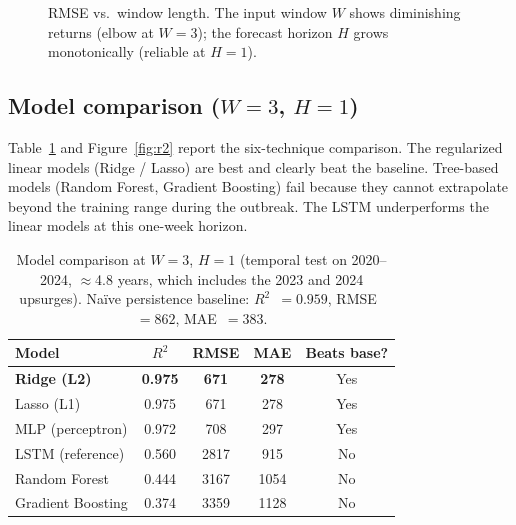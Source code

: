 \documentclass[runningheads]{llncs}
\newcommand{\Rsq}{$R^2$}
\begin{document}
\begin{figure}[H]
\centering
{}
\caption{RMSE vs.\ window length. The input window $W$ shows diminishing returns
(elbow at $W=3$); the forecast horizon $H$ grows monotonically (reliable at $H=1$).}
\label{fig:windows}
\end{figure}

\subsection{Model comparison ($W=3$, $H=1$)}
Table~\ref{tab:models} and Figure~\ref{fig:r2} report the six-technique comparison. The
regularized linear models (Ridge / Lasso) are best and clearly beat the baseline. Tree-based
models (Random Forest, Gradient Boosting) fail because they cannot extrapolate beyond the
training range during the outbreak. The LSTM underperforms the linear models at this
one-week horizon.

\begin{table}[t]
\centering\footnotesize
\caption{Model comparison at $W=3$, $H=1$ (temporal test on 2020--2024, $\approx$4.8 years,
which includes the 2023 and 2024 upsurges).
Na\"ive persistence baseline: \Rsq{}~$=0.959$, RMSE~$=862$, MAE~$=383$.}
\label{tab:models}
\begin{tabular}{@{}lcccc@{}}
\toprule
Model & \Rsq{} & RMSE & MAE & Beats base? \\
\midrule
\textbf{Ridge (L2)} & \textbf{0.975} & \textbf{671} & \textbf{278} & Yes \\
Lasso (L1) & 0.975 & 671 & 278 & Yes \\
MLP (perceptron) & 0.972 & 708 & 297 & Yes \\
LSTM (reference) & 0.560 & 2817 & 915 & No \\
Random Forest & 0.444 & 3167 & 1054 & No \\
Gradient Boosting & 0.374 & 3359 & 1128 & No \\
\bottomrule
\end{tabular}
\end{table}
\end{document}
